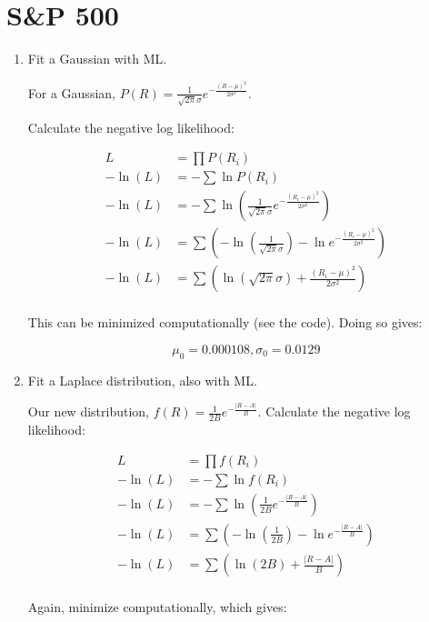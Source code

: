 \section{S\&P 500}

\begin{enumerate}[label=\textbf{\Alph*}.]
    \item Fit a Gaussian with ML.

    For a Gaussian, $P(R) = \frac{1}{\sqrt{2\pi}\sigma} e^{-\frac{(R-\mu)^2}{2\sigma^2}}$.

    Calculate the negative log likelihood:

    \begin{align*}
        L &= \prod P(R_i) \\
        -\ln(L) &= -\sum \ln P(R_i) \\
        -\ln(L) &= -\sum \ln\left(\frac{1}{\sqrt{2\pi}\sigma} e^{-\frac{(R_i-\mu)^2}{2\sigma^2}}\right) \\
        -\ln(L) &= \sum\left( -\ln \left(\frac{1}{\sqrt{2\pi}\sigma}\right) - \ln e^{-\frac{(R_i-\mu)^2}{2\sigma^2}}\right) \\
        -\ln(L) &= \sum\left(\ln \left(\sqrt{2\pi}\sigma\right) + \frac{(R_i-\mu)^2}{2\sigma^2}\right) \\
    \end{align*}

    This can be minimized computationally (see the code). Doing so gives:

    $$\mu_0=0.000108, \sigma_0=0.0129$$

    \item Fit a Laplace distribution, also with ML.

    Our new distribution, $f(R) = \frac{1}{2B} e^{-\frac{|R-A|}{B}}$.
    Calculate the negative log likelihood:

    \begin{align*}
        L &= \prod f(R_i) \\
        -\ln(L) &= -\sum \ln f(R_i) \\
        -\ln(L) &= -\sum \ln\left(\frac{1}{2B} e^{-\frac{|R-A|}{B}}\right) \\
        -\ln(L) &= \sum\left(- \ln\left(\frac{1}{2B}\right) - \ln e^{-\frac{|R-A|}{B}}\right) \\
        -\ln(L) &= \sum\left(\ln\left(2B\right) + \frac{|R-A|}{B}\right) \\
    \end{align*}

    Again, minimize computationally, which gives:


\end{enumerate}
